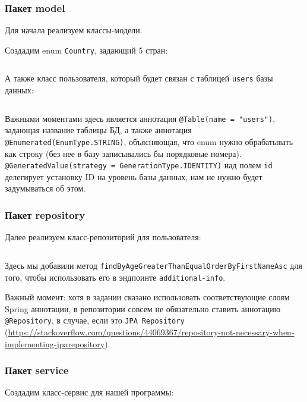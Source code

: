 \documentclass[a4paper, 14pt]{article}
\begin{document}
\subsubsection{Пакет model}

Для начала реализуем классы-модели.

Создадим enum \texttt{Country}, задающий 5 стран:

\normalsize
\inputminted[frame=single]{Java}{../src/main/java/ru/vspochernin/exam/model/Country.java}
\large

А также класс пользователя, который будет связан с таблицей \texttt{users} базы данных:

\normalsize
\inputminted[frame=single]{Java}{../src/main/java/ru/vspochernin/exam/model/User.java}
\large

Важными моментами здесь является аннотация \texttt{@Table(name = "users")}, задающая название таблицы БД, а также аннотация \texttt{@Enumerated(EnumType.STRING)}, объясняющая, что enum нужно обрабатывать как строку (без нее в базу записывались бы порядковые номера). \texttt{@GeneratedValue(strategy = GenerationType.IDENTITY)} над полем \texttt{id} делегирует установку ID на уровень базы данных, нам не нужно будет задумываться об этом.

\subsubsection{Пакет repository}

Далее реализуем класс-репозиторий для пользователя:

\normalsize
\inputminted[frame=single]{Java}{../src/main/java/ru/vspochernin/exam/repository/UserRepository.java}
\large

Здесь мы добавили метод \texttt{findByAgeGreaterThanEqualOrderByFirstNameAsc} для того, чтобы использовать его в эндпоинте \texttt{additional-info}.

Важный момент: хотя в задании сказано использовать соответствующие слоям Spring аннотации, в репозитории совсем не обязательно ставить аннотацию \texttt{@Repository}, в случае, если это \texttt {JPA Repository} (\url{https://stackoverflow.com/questions/44069367/repository-not-necessary-when-implementing-jparepository}).

\subsubsection{Пакет service}

Создадим класс-сервис для нашей программы:
\end{document}
